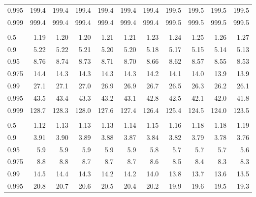 \documentclass[]{article}
\begin{document}
\begin{table}[H]
\begin{tabular}{lrrrrrrrrrr}
\hspace{1em}0.995 & 199.4 & 199.4 & 199.4 & 199.4 & 199.4 & 199.4 & 199.5 & 199.5 & 199.5 & 199.5\\
\hspace{1em}0.999 & 999.4 & 999.4 & 999.4 & 999.4 & 999.4 & 999.4 & 999.5 & 999.5 & 999.5 & 999.5\\
\addlinespace[0.3em]
\multicolumn{11}{l}{\textbf{$k_2=3$}}\\
\hspace{1em}0.5 & 1.19 & 1.20 & 1.20 & 1.21 & 1.21 & 1.23 & 1.24 & 1.25 & 1.26 & 1.27\\
\hspace{1em}0.9 & 5.22 & 5.22 & 5.21 & 5.20 & 5.20 & 5.18 & 5.17 & 5.15 & 5.14 & 5.13\\
\hspace{1em}0.95 & 8.76 & 8.74 & 8.73 & 8.71 & 8.70 & 8.66 & 8.62 & 8.57 & 8.55 & 8.53\\
\hspace{1em}0.975 & 14.4 & 14.3 & 14.3 & 14.3 & 14.3 & 14.2 & 14.1 & 14.0 & 13.9 & 13.9\\
\hspace{1em}0.99 & 27.1 & 27.1 & 27.0 & 26.9 & 26.9 & 26.7 & 26.5 & 26.3 & 26.2 & 26.1\\
\hspace{1em}0.995 & 43.5 & 43.4 & 43.3 & 43.2 & 43.1 & 42.8 & 42.5 & 42.1 & 42.0 & 41.8\\
\hspace{1em}0.999 & 128.7 & 128.3 & 128.0 & 127.6 & 127.4 & 126.4 & 125.4 & 124.5 & 124.0 & 123.5\\
\addlinespace[0.3em]
\multicolumn{11}{l}{\textbf{$k_2=4$}}\\
\hspace{1em}0.5 & 1.12 & 1.13 & 1.13 & 1.13 & 1.14 & 1.15 & 1.16 & 1.18 & 1.18 & 1.19\\
\hspace{1em}0.9 & 3.91 & 3.90 & 3.89 & 3.88 & 3.87 & 3.84 & 3.82 & 3.79 & 3.78 & 3.76\\
\hspace{1em}0.95 & 5.9 & 5.9 & 5.9 & 5.9 & 5.9 & 5.8 & 5.7 & 5.7 & 5.7 & 5.6\\
\hspace{1em}0.975 & 8.8 & 8.8 & 8.7 & 8.7 & 8.7 & 8.6 & 8.5 & 8.4 & 8.3 & 8.3\\
\hspace{1em}0.99 & 14.5 & 14.4 & 14.3 & 14.2 & 14.2 & 14.0 & 13.8 & 13.7 & 13.6 & 13.5\\
\hspace{1em}0.995 & 20.8 & 20.7 & 20.6 & 20.5 & 20.4 & 20.2 & 19.9 & 19.6 & 19.5 & 19.3\\

\end{tabular}
\end{table}
\end{document}
